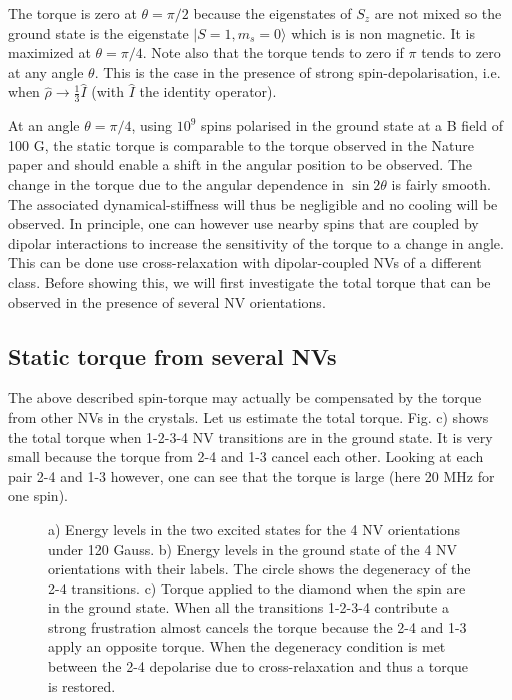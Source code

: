 \documentclass[preprintnumbers,amsmath,amssymb]{revtex4}
\begin{document}
The torque is zero at $\theta=\pi/2$ because the eigenstates of $S_z$ are not mixed so the ground state is the eigenstate $| S=1,m_s=0\rangle$ which is is non magnetic. It is maximized at $\theta=\pi/4$.
Note also that the torque tends to zero if $\pi$ tends to zero at any angle $\theta$. This is the case in the presence of strong spin-depolarisation, i.e. when $\hat\rho\rightarrow\frac{1}{3}\hat{I}$ (with $\hat{I}$ the identity operator).

At an angle $\theta=\pi/4$, using $10^9$ spins polarised in the ground state at a B field of 100 G, the static torque is comparable to the torque observed in the Nature paper and should enable a shift in the angular position to be observed.
The change in the torque due to the angular dependence in $\sin2\theta$ is fairly smooth. The associated dynamical-stiffness will thus be negligible and no cooling will be observed.
In principle, one can however use nearby spins that are coupled by dipolar interactions to increase the sensitivity of the torque to a change in angle. This can be done use cross-relaxation with dipolar-coupled NVs of a different class.
Before showing this, we will first investigate the total torque that can be observed in the presence of several NV orientations. 


\subsection{Static torque from several NVs}

The above described spin-torque may actually be compensated by the torque from other NVs in the crystals. 
Let us estimate the total torque.
Fig. c) shows the total torque when 1-2-3-4 NV transitions are in the ground state. It is very small because the torque from 
2-4 and 1-3 cancel each other. Looking at each pair 2-4 and 1-3 however, one can see that the torque is large (here 20 MHz for one spin).

\begin{figure*}[!ht]
  \centering {}
  \caption{a)  Energy levels in the two excited states for the 4 NV orientations under 120 Gauss. b) Energy levels in the ground state of the 4 NV orientations with their labels. The circle shows the degeneracy of the 2-4 transitions.
  c) Torque applied to the diamond when the spin are in the ground state. When all the transitions 1-2-3-4 contribute a strong frustration almost cancels the torque because the 2-4 and 1-3 apply an opposite torque.  When the degeneracy condition is met between the 2-4 depolarise due to cross-relaxation and thus a torque is restored. 
  }
\end{figure*}
\end{document}
